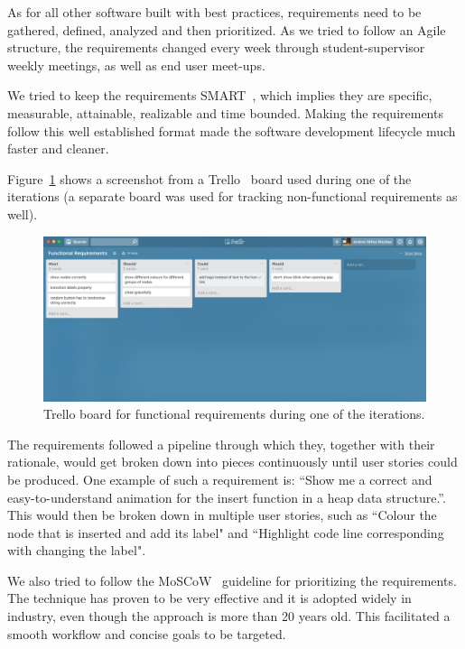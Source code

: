 \documentclass{l4proj}
\begin{document}
As for all other software built with best practices, requirements need to be gathered, defined, analyzed and then prioritized. As we tried to follow an Agile structure, the requirements changed every week through student-supervisor weekly meetings, as well as end user meet-ups.

We tried to keep the requirements SMART~\cite{smart-requirements}, which implies they are specific, measurable,
attainable, realizable and time bounded. Making the requirements follow this well established format made the software development lifecycle much faster and cleaner.

Figure~\ref{fig:trello-functional-requirements} shows a screenshot from a Trello~\cite{trello} board used during one of the iterations (a separate board was used for tracking non-functional requirements as well).

\begin{figure}[!ht]
\centering
\includegraphics[scale=0.35]{trello-functional-requirements}
\caption{Trello board for functional requirements during one of the iterations.}
\label{fig:trello-functional-requirements}
\end{figure}

The requirements followed a pipeline through which they, together with their rationale, would get broken down
into pieces continuously until user stories could be produced. One example of such a requirement is: ``Show me a
correct and easy-to-understand animation for the insert function in a heap data structure.''. This would then be broken
down in multiple user stories, such as ``Colour the node that is inserted and add its label" and ``Highlight code line corresponding with changing the label".

We also tried to follow the MoSCoW~\cite{moscow-requirements} guideline for prioritizing the requirements. The technique has proven to be very effective and it is adopted widely in industry, even though the approach is more than 20 years old. This facilitated a smooth workflow and concise goals to be targeted.
\end{document}
